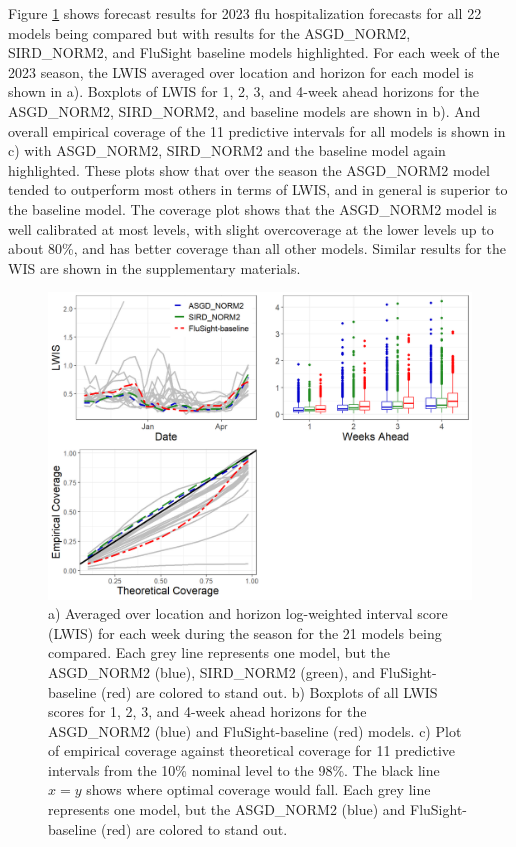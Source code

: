 Figure \ref{fig:lwis_cover_sum} shows forecast results for 2023 flu 
hospitalization forecasts for all 22 models being compared but with results
for the ASGD\_NORM2, SIRD\_NORM2, and FluSight baseline models highlighted. 
For each week of the 2023 season, the  
LWIS averaged over location and horizon 
for each model is shown in a). Boxplots of LWIS for 1, 2, 3, and 4-week ahead
horizons for the ASGD\_NORM2, SIRD\_NORM2, and baseline models are shown in b). 
And 
overall empirical coverage of the 11 predictive intervals for all models is 
shown in c) with ASGD\_NORM2, SIRD\_NORM2
and the baseline model again highlighted. 
These plots show that over the season the ASGD\_NORM2 model tended to 
outperform most others in terms of LWIS, and in general is superior to the 
baseline model. The coverage plot shows that the ASGD\_NORM2 model is well 
calibrated at most levels, with slight overcoverage at the lower levels
up to about 80\%, and has better coverage than all other models. Similar results
for the WIS are shown in the supplementary materials.






\begin{figure}[hbt!]
    
    \begin{adjustwidth}{-1.2cm}{-1.5cm}
    \includegraphics[scale = .54]{Images/lwis_cover_sum.png}
    \caption{a) Averaged over location and horizon log-weighted interval score
    (LWIS) for each week during the season for the 21 models being compared. 
    Each grey line represents one model, but the ASGD\_NORM2 (blue), 
    SIRD\_NORM2 (green), and 
    FluSight-baseline (red) are colored to stand out.
    b) Boxplots of all LWIS scores for 1, 2, 3, and 4-week ahead horizons 
    for the ASGD\_NORM2 (blue) and FluSight-baseline (red) models.
    c) Plot of empirical coverage against theoretical coverage for 11 
    predictive intervals from the 10\% nominal level to the 98\%. The black
    line $x = y$ shows where optimal coverage would fall.
    Each grey line represents one model, but the ASGD\_NORM2 (blue) and 
    FluSight-baseline (red) are colored to stand out.}
    \end{adjustwidth}
    \label{fig:lwis_cover_sum}
\end{figure}

